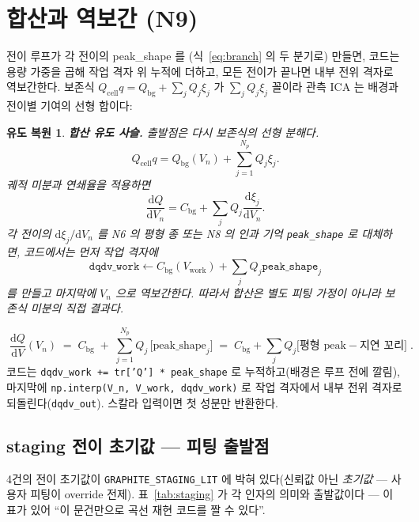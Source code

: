\documentclass[11pt,a4paper]{article}
\newtheorem*{derivebox}{유도 복원}
\newcommand{\dd}{\mathrm{d}}
\newcommand{\cell}{\mathrm{cell}}
\newcommand{\bg}{\mathrm{bg}}
\newcommand{\work}{\mathrm{work}}
\newcommand{\code}[1]{\texttt{#1}}
\begin{document}
\section{합산과 역보간 (N9)}\label{sec:sum}
전이 루프가 각 전이의 peak\_shape 를 (식~\eqref{eq:branch} 의 두 분기로) 만들면, 코드는 용량 가중을 곱해 작업 격자 위
누적에 더하고, 모든 전이가 끝나면 내부 전위 격자로 역보간한다. 보존식 $Q_\cell q=Q_\bg+\sum_jQ_j\xi_j$ 가
$\sum_jQ_j\xi_j$ 꼴이라 관측 ICA 는 배경과 전이별 기여의 선형 합이다:

\begin{derivebox}
\textbf{합산 유도 사슬.} 출발점은 다시 보존식의 선형 분해다.
\begin{equation*}
Q_{\cell}q=Q_{\bg}(V_n)+\sum_{j=1}^{N_p}Q_j\xi_j.
\end{equation*}
궤적 미분과 연쇄율을 적용하면
\begin{equation*}
\frac{\dd Q}{\dd V_n}=C_{\bg}+\sum_j Q_j\frac{\dd\xi_j}{\dd V_n}.
\end{equation*}
각 전이의 $\dd\xi_j/\dd V_n$ 를 N6 의 평형 종 또는 N8 의 인과 기억 \code{peak\_shape} 로 대체하면, 코드에서는 먼저 작업 격자에
\begin{equation*}
\code{dqdv\_work}\leftarrow C_{\bg}(V_{\work})+\sum_j Q_j\code{peak\_shape}_j
\end{equation*}
를 만들고 마지막에 $V_n$ 으로 역보간한다. 따라서 합산은 별도 피팅 가정이 아니라 보존식 미분의 직접 결과다.
\end{derivebox}

\begin{equation}
\boxed{\;\frac{\dd Q}{\dd V}(V_n)\;=\;C_\bg\;+\;\sum_{j=1}^{N_p}Q_j\,
\big[\text{peak\_shape}_j\big]
\;=\;C_\bg+\sum_jQ_j\big[\text{평형 peak}-\text{지연 꼬리}\big]\;.}
\label{eq:sum}
\end{equation}
코드는 \code{dqdv\_work += tr['Q'] * peak\_shape} 로 누적하고(배경은 루프 전에 깔림), 마지막에
\code{np.interp(V\_n, V\_work, dqdv\_work)} 로 작업 격자에서 내부 전위 격자로 되돌린다(\code{dqdv\_out}).
스칼라 입력이면 첫 성분만 반환한다.

\subsection{staging 전이 초기값 — 피팅 출발점}
4건의 전이 초기값이 \code{GRAPHITE\_STAGING\_LIT} 에 박혀 있다(신뢰값 아닌 \emph{초기값} — 사용자 피팅이 override
전제). 표~\ref{tab:staging} 가 각 인자의 의미와 출발값이다 — 이 표가 있어 ``이 문건만으로 곡선 재현 코드를 짤 수 있다''.
\end{document}
